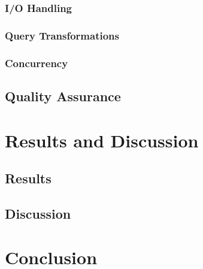 \documentclass[a4paper,oneside,12pt]{book}
\begin{document}
\subsection{I/O Handling}
\subsection{Query Transformations}
\subsection{Concurrency}

\section{Quality Assurance}

\chapter{Results and Discussion}
\section{Results}
\section{Discussion}

\chapter{Conclusion}
\end{document}

